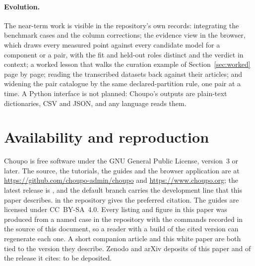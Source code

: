 \documentclass[11pt,a4paper]{article}
\newcommand{\code}[1]{\texttt{\detokenize{#1}}}
\begin{document}
\paragraph{Evolution.}  The near-term work is visible in the repository's
own records: integrating the benchmark cases and the column corrections;
the evidence view in the browser, which draws every measured point against
every candidate model for a component or a pair, with the fit and held-out
roles distinct and the verdict in context; a worked lesson that walks the
curation example of Section~\ref{sec:worked} page by page; reading the
transcribed datasets back against their articles; and widening the pair
catalogue by the same declared-partition rule, one pair at a time.  A
Python interface is not planned: Choupo's outputs are plain-text
dictionaries, CSV and JSON, and any language reads them.

\section{Availability and reproduction}
\label{sec:availability}

Choupo is free software under the GNU General Public License, version~3 or
later.  The source, the tutorials, the guides and the browser application
are at \url{https://github.com/choupo-admin/choupo} and
\url{https://www.choupo.org}; the latest release is \code{Choupo-2608}, and
the default branch carries the development line that this paper describes.
\code{CITATION.cff} in the repository gives the preferred citation.  The
guides are licensed under CC~BY-SA~4.0.  Every listing and figure in this
paper was produced from a named case in the repository with the commands
recorded in the source of this document, so a reader with a build of the
cited version can regenerate each one.  A short companion article and this
white paper are both tied to the version they describe.  Zenodo and arXiv
deposits of this paper and of the release it cites: to be deposited.
\end{document}

